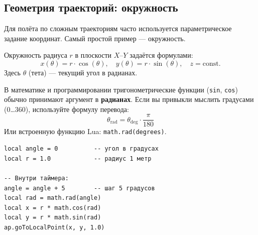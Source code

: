 \subsection{Геометрия траекторий: окружность}

Для полёта по сложным траекториям часто используется параметрическое задание координат. Самый простой пример — окружность.

Окружность радиуса \(r\) в плоскости \(X\)–\(Y\) задаётся формулами:
\[
  x(\theta) = r \cdot \cos(\theta),\quad y(\theta) = r \cdot \sin(\theta),\quad z = \text{const}.
\]
Здесь \(\theta\) (тета) — текущий угол в радианах.

\begin{infobox}
В математике и программировании тригонометрические функции (\texttt{sin}, \texttt{cos}) обычно принимают аргумент в \textbf{радианах}.
Если вы привыкли мыслить градусами (0\dots360), используйте формулу перевода:
\[
  \theta_{\mathrm{rad}} = \theta_{\mathrm{deg}} \cdot \frac{\pi}{180}
\]
Или встроенную функцию Lua: \texttt{math.rad(degrees)}.
\end{infobox}

\begin{codebox}
\begin{verbatim}
local angle = 0          -- угол в градусах
local r = 1.0            -- радиус 1 метр

-- Внутри таймера:
angle = angle + 5        -- шаг 5 градусов
local rad = math.rad(angle)
local x = r * math.cos(rad)
local y = r * math.sin(rad)
ap.goToLocalPoint(x, y, 1.0)
\end{verbatim}
\end{codebox}
